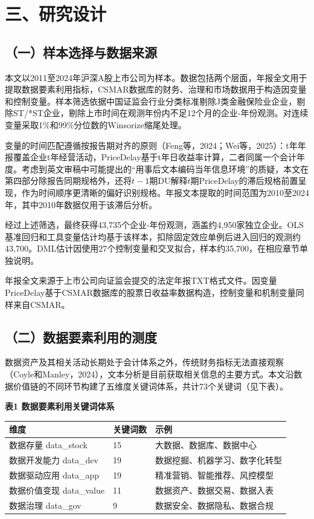 \section{三、研究设计}\label{ux4e09ux7814ux7a76ux8bbeux8ba1}

\subsection{（一）样本选择与数据来源}\label{ux4e00ux6837ux672cux9009ux62e9ux4e0eux6570ux636eux6765ux6e90}

本文以2011至2024年沪深A股上市公司为样本。数据包括两个层面，年报全文用于提取数据要素利用指标，CSMAR数据库的财务、治理和市场数据用于构造因变量和控制变量。样本筛选依据中国证监会行业分类标准剔除J类金融保险业企业，剔除ST/*ST企业，剔除上市时间在观测年份内不足12个月的企业-年份观测。对连续变量采取1\%和99\%分位数的Winsorize缩尾处理。

变量的时间匹配遵循按报告期对齐的原则（Feng等，2024；Wei等，2025）：t年年报覆盖企业t年经营活动，PriceDelay基于t年日收益率计算，二者同属一个会计年度。考虑到英文审稿中可能提出的``用事后文本编码当年信息环境''的质疑，本文在第四部分除报告同期规格外，还将\(t-1\)期DU解释\(t\)期PriceDelay的滞后规格前置呈现，作为时间顺序更清晰的偏好识别规格。年报文本提取的时间范围为2010至2024年，其中2010年数据仅用于该滞后分析。

经过上述筛选，最终获得43,735个企业-年份观测，涵盖约4,950家独立企业。OLS基准回归和工具变量估计均基于该样本，扣除固定效应单例后进入回归的观测约43,700。DML估计因使用27个控制变量和交叉拟合，样本约35,700，在相应章节单独说明。

年报全文来源于上市公司向证监会提交的法定年报TXT格式文件。因变量PriceDelay基于CSMAR数据库的股票日收益率数据构造，控制变量和机制变量同样来自CSMAR。

\subsection{（二）数据要素利用的测度}\label{ux4e8cux6570ux636eux8981ux7d20ux5229ux7528ux7684ux6d4bux5ea6}

数据资产及其相关活动长期处于会计体系之外，传统财务指标无法直接观察（Coyle和Manley，2024），文本分析是目前获取相关信息的主要方式。本文沿数据价值链的不同环节构建了五维度关键词体系，共计73个关键词（见下表）。

\textbf{表1 数据要素利用关键词体系}

{\def\LTcaptype{} %
\begin{longtable}[]{@{}lll@{}}
\toprule\noalign{}
维度 & 关键词数 & 示例 \\
\midrule\noalign{}
\endhead
\bottomrule\noalign{}
\endlastfoot
数据存量 data\_stock & 15 & 大数据、数据库、数据中心 \\
数据开发能力 data\_dev & 19 & 数据挖掘、机器学习、数字化转型 \\
数据驱动应用 data\_app & 19 & 精准营销、智能推荐、风控模型 \\
数据价值变现 data\_value & 11 & 数据资产、数据交易、数据入表 \\
数据治理 data\_gov & 9 & 数据安全、数据隐私、数据合规 \\
\end{longtable}
}

